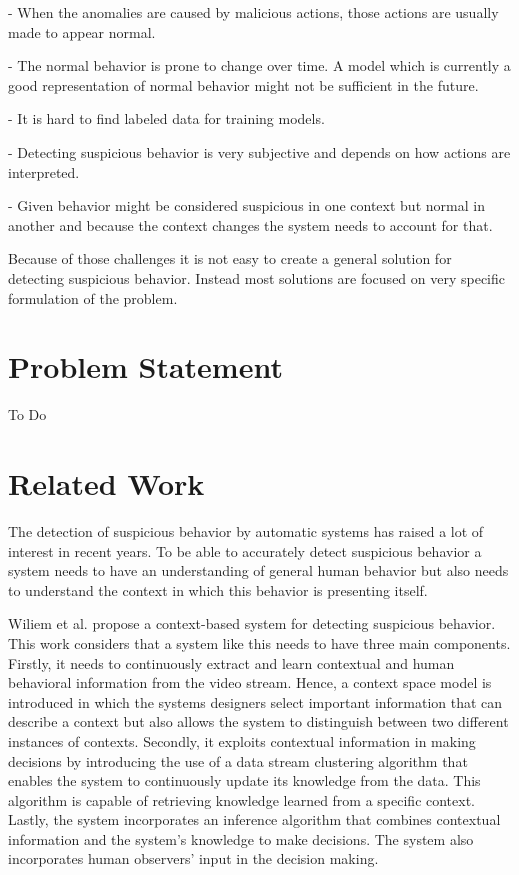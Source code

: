 - When the anomalies are caused by malicious actions, those actions are usually made to appear normal.

- The normal behavior is prone to change over time. A model which is currently a good representation of normal behavior might not be sufficient in the future.

- It is hard to find labeled data for training models.

- Detecting suspicious behavior is very subjective and depends on how actions are interpreted.

- Given behavior might be considered suspicious in one context but normal in another and because the context changes the system needs to account for that.

Because of those challenges it is not easy to create a general solution for detecting suspicious behavior. Instead most solutions are focused on very specific formulation of the problem.


\section{Problem Statement}
To Do



\section{Related Work}

The detection of suspicious behavior by automatic systems has raised a lot of interest in recent years. To be able to accurately detect suspicious behavior a system needs to have an understanding of general human behavior but also needs to understand the context in which this behavior is presenting itself.

Wiliem et al. \cite{n1} propose a context-based system for detecting suspicious behavior. This work considers that a system like this needs to have three main components. Firstly, it needs to continuously extract and learn contextual and human behavioral information from the video stream. Hence, a context space model is introduced in which the systems designers select important information that can describe a context but also allows the system to distinguish between two different instances of contexts. Secondly, it exploits contextual information in making decisions by introducing the use of a data stream clustering algorithm that enables the system to continuously update its knowledge from the data. This algorithm is capable of retrieving knowledge learned from a specific context. Lastly, the system incorporates an inference algorithm that combines contextual information and the system's knowledge to make decisions. The system also incorporates human observers' input in the decision making.

